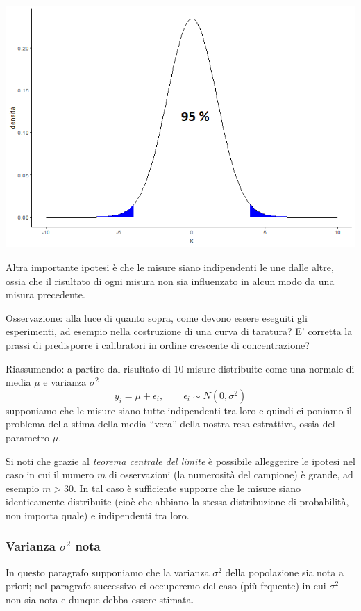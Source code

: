\documentclass[
  11pt,
]{book}
\begin{document}
\begin{center}\includegraphics[width=0.5\linewidth]{Immagini/Inferenziale/probamis} \end{center}

Altra importante ipotesi è che le misure siano indipendenti le une dalle altre, ossia che il risultato di ogni misura non sia influenzato in alcun modo da una misura precedente.

Osservazione: alla luce di quanto sopra, come devono essere eseguiti gli esperimenti, ad esempio nella costruzione di una curva di taratura?
E' corretta la prassi di predisporre i calibratori in ordine crescente di concentrazione?

Riassumendo: a partire dal risultato di \(10\) misure distribuite come una normale di media \(\mu\) e varianza \(\sigma^2\)
\[
y_i=\mu+\epsilon_i, \qquad \epsilon_i \sim N(0,\sigma^2)
\]
supponiamo che le misure siano tutte indipendenti tra loro e quindi ci poniamo il problema della stima della media ``vera'' della nostra resa estrattiva, ossia del parametro \(\mu\).

Si noti che grazie al \emph{teorema centrale del limite} è possibile alleggerire le ipotesi nel caso in cui il numero \(m\) di osservazioni (la numerosità del campione) è grande, ad esempio \(m>30\). In tal caso è sufficiente supporre che le misure siano identicamente distribuite (cioè che abbiano la stessa distribuzione di probabilità, non importa quale) e indipendenti tra loro.

\hypertarget{varianza-sigma2-nota}{%
\subsubsection{\texorpdfstring{Varianza \(\sigma^2\) nota}{Varianza \textbackslash sigma\^{}2 nota}}\label{varianza-sigma2-nota}}

In questo paragrafo supponiamo che la varianza \(\sigma^2\) della popolazione sia nota a priori; nel paragrafo successivo ci occuperemo del caso (più frquente) in cui \(\sigma^2\) non sia nota e dunque debba essere stimata.
\end{document}
